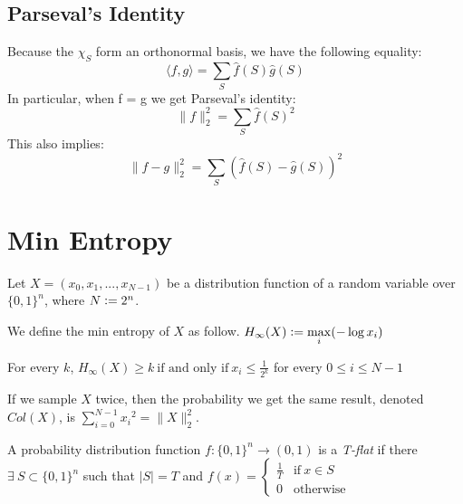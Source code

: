 \section{Parseval's Identity}
Because the $\chi_S$ form an orthonormal basis, we have the following equality:
\begin{equation}
\langle f, g \rangle = \sum\limits_{S} \hat{f}(S) \hat{g}(S)
\end{equation}
In particular, when f = g we get Parseval's identity:
\begin{equation}
\| f \|_2^2 = \sum\limits_{S} \hat{f}(S)^2
\end{equation}
This also implies:
\begin{equation}
\| f - g \|_2^2 = \sum\limits_{S} (\hat{f}(S) - \hat{g}(S))^2
\end{equation}

\chapter{Min Entropy}
Let $X = (x_0, x_1, ..., x_{N-1})$ be a distribution function of a random variable over $\{ 0, 1 \}^n$, where $N \vcentcolon= 2^n$. 
\begin{definition}
We define the min entropy of $X$ as follow.\center
$H_\infty (X) \vcentcolon= \max\limits_{i} (- \log x_i)$
\end{definition}

\begin{theorem}
For every $k$, $H_\infty(X) \geq k \ \text{if and only if} \ x_i \leq \frac{1}{2^k} $ for every $0 \leq i \leq N-1$
\end{theorem}

\begin{theorem}
If we sample $X$ twice, then the probability we get the same result, denoted $Col(X)$, is 
$\sum\limits_{i = 0}^{N-1} {x_i}^2 = \| X \|_2^2$.
\end{theorem}

\begin{definition}
A probability distribution function $f \colon \{ 0, 1 \}^n \rightarrow (0,1)$ is a \textit{T-flat} if there $\exists \ S \subset \{ 0,1 \}^n$ such that $|S| = T$ and 
$f(x) = 
\begin{cases}
	\frac{1}{T} & \text{if} \ x \in S \\
	0             & \text{otherwise}
\end{cases}$
\end{definition}

